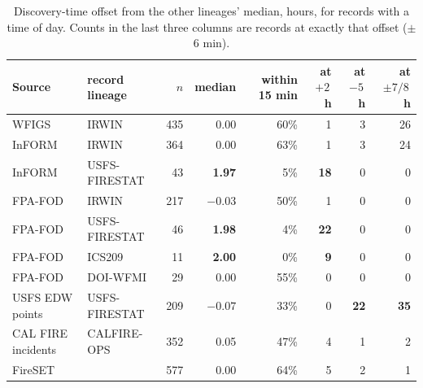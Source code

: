 \documentclass[11pt,a4paper]{article}
\begin{document}
\begin{table}[h]
\centering\small
\caption{Discovery-time offset from the other lineages' median, hours, for records with a time of day.
Counts in the last three columns are records at exactly that offset ($\pm$6 min).}
\label{tab:timing}
\begin{tabular}{@{}llrrrrrr@{}}
\toprule
Source & record lineage & $n$ & median & within 15 min & at $+2$\,h & at $-5$\,h & at $\pm7/8$\,h\\
\midrule
WFIGS & IRWIN & 435 & 0.00 & 60\% & 1 & 3 & 26\\
InFORM & IRWIN & 364 & 0.00 & 63\% & 1 & 3 & 24\\
InFORM & USFS-FIRESTAT & 43 & \textbf{1.97} & 5\% & \textbf{18} & 0 & 0\\
FPA-FOD & IRWIN & 217 & $-0.03$ & 50\% & 1 & 0 & 0\\
FPA-FOD & USFS-FIRESTAT & 46 & \textbf{1.98} & 4\% & \textbf{22} & 0 & 0\\
FPA-FOD & ICS209 & 11 & \textbf{2.00} & 0\% & \textbf{9} & 0 & 0\\
FPA-FOD & DOI-WFMI & 29 & 0.00 & 55\% & 0 & 0 & 0\\
USFS EDW points & USFS-FIRESTAT & 209 & $-0.07$ & 33\% & 0 & \textbf{22} & \textbf{35}\\
CAL FIRE incidents & CALFIRE-OPS & 352 & 0.05 & 47\% & 4 & 1 & 2\\
FireSET & & 577 & 0.00 & 64\% & 5 & 2 & 1\\
\bottomrule
\end{tabular}
\end{table}
\end{document}
